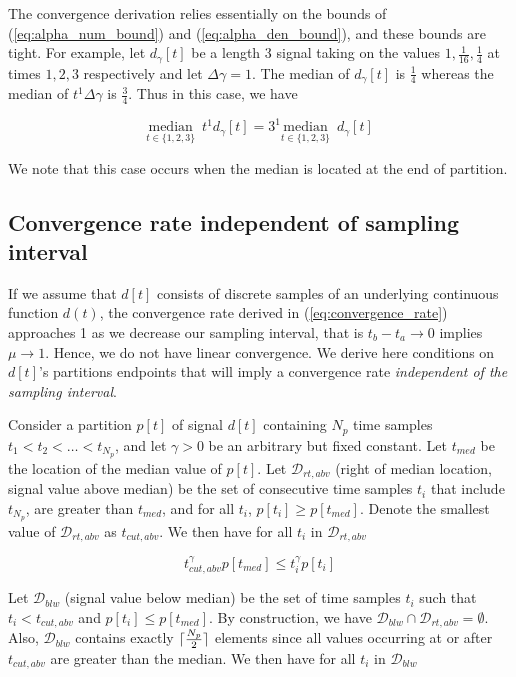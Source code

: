 \documentclass{segabs}
\DeclarePairedDelimiter{\ceil}{\lceil}{\rceil}
\newcommand{\deltagamma}{{\Delta\gamma}}
\newcommand{\undermedian}[2]{\underset{#1}{\text{median}}\,\,\,#2}
\newcommand{\Drightabove}{{\mathcal{D}_{rt,abv}}}
\newcommand{\Dbelow}{{\mathcal{D}_{blw}}}
\newcommand{\tcut}{t_{cut,abv}}
\begin{document}
The convergence derivation relies essentially on the bounds of (\ref{eq:alpha_num_bound}) and (\ref{eq:alpha_den_bound}), and these bounds are tight. For example, let $d_\gamma[t]$ be a length 3 signal taking on the values  $1,\frac{1}{16},\frac{1}{4}$ at times $1,2,3$ respectively and let $\deltagamma=1$.  The median of $d_\gamma[t]$ is $\frac{1}{4}$ whereas the median of $t^1\deltagamma$ is $\frac{3}{4}$.  Thus in this case, we have

\begin{equation}
\undermedian{t \in \{1,2,3\} }{t^1 d_\gamma[t]}  = 3^1 \undermedian{t \in \{1,2,3\}}{ d_\gamma[t]} 
\end{equation}

We note that this case occurs when the median is located at the end of partition.

\subsection{Convergence rate independent of sampling interval}


If we assume that $d[t]$ consists of discrete samples of an underlying continuous function $d(t)$, the convergence rate derived in (\ref{eq:convergence_rate}) approaches 1 as we decrease our sampling interval, that is $t_b - t_a \rightarrow 0$ implies $\mu \rightarrow 1$. Hence, we do not have  linear convergence. We derive here conditions on $d[t]$'s partitions endpoints that will imply a convergence rate \emph{independent of the sampling interval}. 


Consider a partition $p[t]$ of signal $d[t]$ containing $N_p$ time samples $t_1 < t_2 < \ldots < t_{N_p}$, and let $\gamma >0$ be an arbitrary but fixed constant. Let $t_{med}$ be the location of the median value of $p[t]$.  Let $\Drightabove$ (right of median location, signal value above median) be the set of consecutive time samples $t_i$ that include $t_{N_p}$, are greater than $t_{med}$, and for all $t_i$, $p[t_i] \geq p[t_{med}]$.  Denote the smallest value of $\Drightabove$ as $\tcut$. We then have for all $t_i$ in $\Drightabove$ 

\begin{equation}
\label{eq:above_cut}
\tcut^\gamma p[t_{med}] \leq t_i^\gamma p[t_i]
\end{equation}

Let $\Dbelow$ (signal value below median) be the set of time samples $t_i$ such that $t_i < \tcut$ and $p[t_i] \leq p[t_{med}]$. By construction, we have $\Dbelow \cap  \Drightabove = \emptyset$. Also, $\Dbelow$ contains exactly $\ceil{ \frac{N_p}{2}}$ elements since all values occurring at or after $\tcut$ are greater than the median.  We then have for all $t_i$ in $\Dbelow$ 
\end{document}
